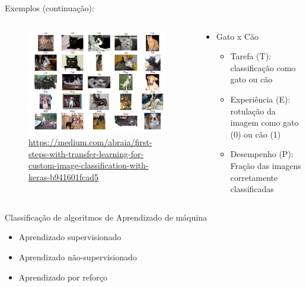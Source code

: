 \documentclass[aspectratio=169,presentation,mathserif,10pt]{beamer}
\begin{document}
\begin{frame}[label={sec:org7e32bd3}]{Exemplos (continuação):}
\begin{columns}
\begin{column}{0.5\columnwidth}
\begin{figure}[htbp]
\centering
\includegraphics[height=.7\textheight]{./fig/catxdog.png}
\caption{\url{https://medium.com/abraia/first-steps-with-transfer-learning-for-custom-image-classification-with-keras-b941601fcad5}}
\end{figure}
\end{column}

\begin{column}{0.5\columnwidth}
\begin{itemize}
\item Gato x Cão
\begin{itemize}
\item Tarefa (T): classificação como gato ou cão
\item Experiência (E): rotulação da imagem como gato (0) ou cão (1)
\item Desempenho (P): Fração das imagens corretamente classificadas
\end{itemize}
\end{itemize}
\end{column}
\end{columns}
\end{frame}



\begin{frame}[label={sec:org4df46a8}]{Classificação de algoritmos de Aprendizado de máquina}
\begin{itemize}
\item Aprendizado supervisionado
\item Aprendizado não-supervisionado
\item Aprendizado por reforço
\end{itemize}
\end{frame}
\end{document}
